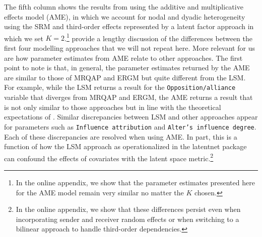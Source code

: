 \documentclass[11pt,pdflatex]{elsarticle}
\newcommand{\pkg}[1]{{\fontseries{b}\selectfont #1}}
\begin{document}
The fifth column shows the results from using the additive and multiplicative effects model (AME), in which we account for nodal and dyadic heterogeneity using the SRM and third-order effects represented by a latent factor approach in which we set $K=2$.\footnote{In the online appendix, we show that the parameter estimates presented here for the AME model remain very similar no matter the $K$ chosen.} \citet{cranmer:etal:2016} provide a lengthy discussion of the differences between the first four modelling approaches that we will not repeat here. More relevant for us are how parameter estimates from AME relate to other approaches. The first point to note is that, in general, the parameter estimates returned by the AME are similar to those of MRQAP and ERGM but quite different from the LSM. For example, while the LSM returns a result for the \texttt{Opposition/alliance} variable that diverges from MRQAP and ERGM, the AME returns a result that is not only similar to those approaches but in line with the theoretical expectations of \citet{ingold:fischer:2014}. Similar discrepancies between LSM and other approaches appear for parameters such as \texttt{Influence attribution} and \texttt{Alter's influence degree}. Each of these discrepancies are resolved when using AME. In part, this is a function of  how the LSM approach as operationalized in the \pkg{latentnet} package can confound the effects of covariates with the latent space metric.\footnote{In the online appendix, we show that these differences persist even when incorporating sender and receiver random effects or when switching to a bilinear approach to handle third-order dependencies.} %
\end{document}
